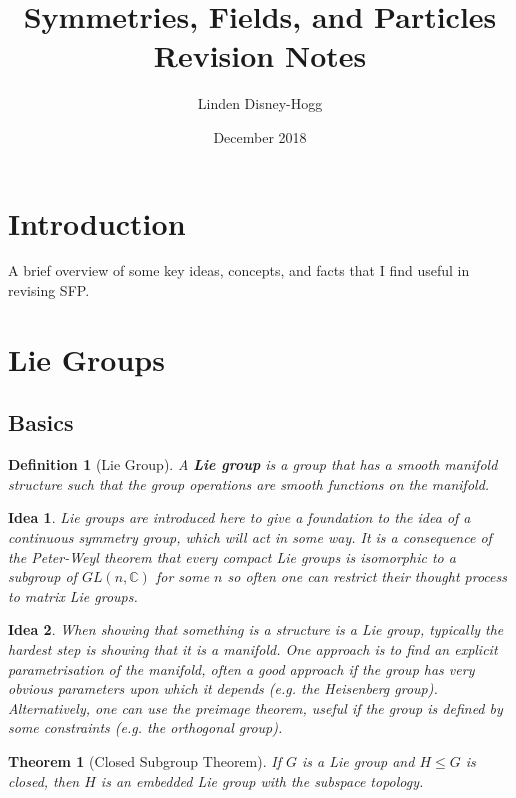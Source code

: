 \documentclass{article}
\title{Symmetries, Fields, and Particles Revision Notes}
\author{Linden Disney-Hogg}
\date{December 2018}
\newtheorem{theorem}{Theorem}[subsection]
\newtheorem{definition}{Definition}[subsection]
\newtheorem*{idea}{Idea}
\newcommand{\bam}[1]{\textbf{#1}}
\newcommand{\mbb}[1]{\mathbb{#1}}
\begin{document}
\maketitle
\tableofcontents

\section{Introduction}
A brief overview of some key ideas, concepts, and facts that I find useful in revising SFP. 

\section{Lie Groups}
\subsection{Basics}
\begin{definition}[Lie Group]
A \bam{Lie group} is a group that has a smooth manifold structure such that the group operations are smooth functions on the manifold. 
\end{definition}

\begin{idea}
Lie groups are introduced here to give a foundation to the idea of a continuous symmetry group, which will act in some way. It is a consequence of the Peter-Weyl theorem that every compact Lie groups is isomorphic to a subgroup of $GL(n,\mbb{C})$ for some $n$ so often one can restrict their thought process to matrix Lie groups.
\end{idea}

\begin{idea}
When showing that something is a structure is a Lie group, typically the hardest step is showing that it is a manifold. One approach is to find an explicit parametrisation of the manifold, often a good approach if the group has very obvious parameters upon which it depends (e.g. the Heisenberg group). Alternatively, one can use the preimage theorem, useful if the group is defined by some constraints (e.g. the orthogonal group).
\end{idea}

\begin{theorem}[Closed Subgroup Theorem]
If $G$ is a Lie group and $H\leq G$ is closed, then $H$ is an embedded Lie group with the subspace topology. 
\end{theorem}
\end{document}
